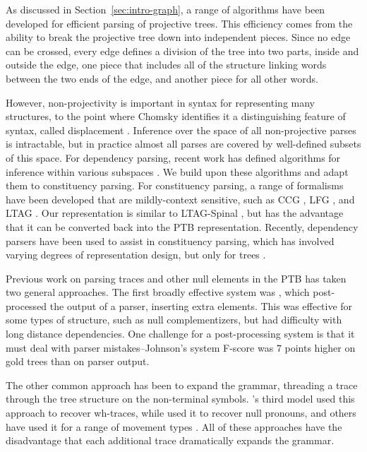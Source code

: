 As discussed in Section~\ref{sec:intro-graph}, a range of algorithms have been developed for efficient parsing of projective trees.
This efficiency comes from the ability to break the projective tree down into independent pieces.
Since no edge can be crossed, every edge defines a division of the tree into two parts, inside and outside the edge, \myie one piece that includes all of the structure linking words between the two ends of the edge, and another piece for all other words.

However, non-projectivity is important in syntax for representing many structures, to the point where Chomsky identifies it a distinguishing feature of syntax, called displacement \parencite{displacement}.
Inference over the space of all non-projective parses is intractable, but in practice almost all parses are covered by well-defined subsets of this space.
For dependency parsing, recent work has defined algorithms for inference within various subspaces \parencite{Gomez-Rodriguez:2010,ec}.
We build upon these algorithms and adapt them to constituency parsing.
For constituency parsing, a range of formalisms have been developed that are mildly-context sensitive, such as CCG \parencite{Steedman:2000}, LFG \parencite{Bresnan:1982}, and LTAG \parencite{Joshi:1997}.
Our representation is similar to LTAG-Spinal \parencite{Shen:2007}, but has the advantage that it can be converted back into the PTB representation.
Recently, dependency parsers have been used to assist in constituency parsing, which has involved varying degrees of representation design, but only for trees \parencite{hall2007hybrid,hall-nivre:2008:PaGe,kong-rush-smith:2015:NAACL-HLT,fernandezgonzalez-martins:2015:ACL-IJCNLP}.

Previous work on parsing traces and other null elements in the PTB has taken two general approaches.
The first broadly effective system was \textcite{Johnson:2002}, which post-processed the output of a parser, inserting extra elements.
This was effective for some types of structure, such as null complementizers, but had difficulty with long distance dependencies.
One challenge for a post-processing system is that it must deal with parser mistakes--Johnson's system F-score was $7$ points higher on gold trees than on parser output.

The other common approach has been to expand the grammar, threading a trace through the tree structure on the non-terminal symbols.
\textcite{Collins:1997}'s third model used this approach to recover wh-traces, while \textcite{cai-chiang-goldberg:2011} used it to recover null pronouns, and others have used it for a range of movement types \parencite{dienes-dubey:2003,schmid:2006}.
All of these approaches have the disadvantage that each additional trace dramatically expands the grammar.


